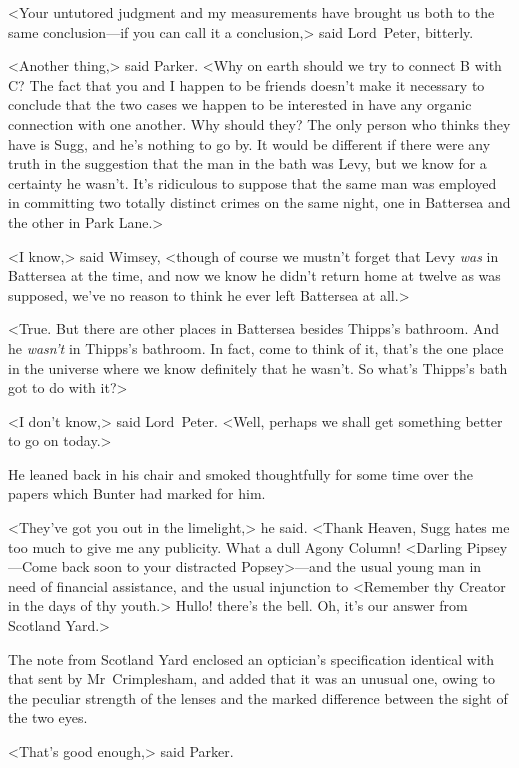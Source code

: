 <Your untutored judgment and my measurements have brought us both to the same conclusion—if you can call it a conclusion,> said Lord~Peter, bitterly.

<Another thing,> said Parker. <Why on earth should we try to connect {\large B} with {\large C}? The fact that you and I happen to be friends doesn't make it necessary to conclude that the two cases we happen to be interested in have any organic connection with one another. Why should they? The only person who thinks they have is Sugg, and he's nothing to go by. It would be different if there were any truth in the suggestion that the man in the bath was Levy, but we know for a certainty he wasn't. It's ridiculous to suppose that the same man was employed in committing two totally distinct crimes on the same night, one in Battersea and the other in Park Lane.>

<I know,> said Wimsey, <though of course we mustn't forget that Levy \emph{was} in Battersea at the time, and now we know he didn't return home at twelve as was supposed, we've no reason to think he ever left Battersea at all.>

<True. But there are other places in Battersea besides Thipps's bathroom. And he \emph{wasn't} in Thipps's bathroom. In fact, come to think of it, that's the one place in the universe where we know definitely that he wasn't. So what's Thipps's bath got to do with it?>

<I don't know,> said Lord~Peter. <Well, perhaps we shall get something better to go on today.>

He leaned back in his chair and smoked thoughtfully for some time over the papers which Bunter had marked for him.

<They've got you out in the limelight,> he said. <Thank Heaven, Sugg hates me too much to give me any publicity. What a dull Agony Column! <Darling Pipsey—Come back soon to your distracted Popsey>—and the usual young man in need of financial assistance, and the usual injunction to <Remember thy Creator in the days of thy youth.> Hullo! there's the bell. Oh, it's our answer from Scotland Yard.>

The note from Scotland Yard enclosed an optician's specification identical with that sent by Mr~Crimplesham, and added that it was an unusual one, owing to the peculiar strength of the lenses and the marked difference between the sight of the two eyes.

<That's good enough,> said Parker.

